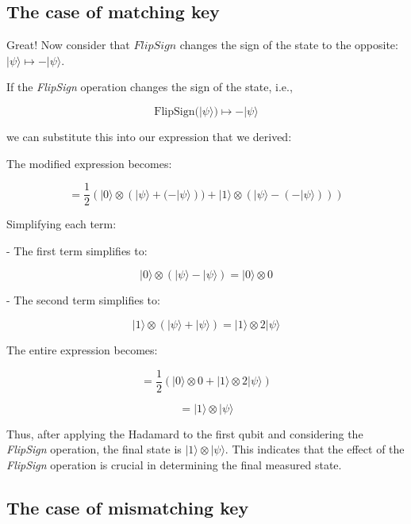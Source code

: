 \subsection{The case of matching key}

\begin{ai}
Great! Now consider that $FlipSign$ changes the sign of the state to the opposite: $|\psi\rangle
\mapsto -|\psi\rangle$.
\end{ai}

\begin{airesult}
If the \textit{FlipSign} operation changes the sign of the state, i.e.,

\[
\text{FlipSign}(|\psi\rangle) \mapsto -|\psi\rangle
\]

we can substitute this into our expression that we derived:

\vsp

The modified expression becomes:

\[
= \dfrac{1}{2} \left( |0\rangle \otimes (|\psi\rangle + (-|\psi\rangle))
+ |1\rangle \otimes (|\psi\rangle - (-|\psi\rangle)) \right)
\]

Simplifying each term:

- The first term simplifies to:

\[
|0\rangle \otimes (|\psi\rangle - |\psi\rangle) = |0\rangle \otimes 0
\]

- The second term simplifies to:

\[
|1\rangle \otimes (|\psi\rangle + |\psi\rangle) = |1\rangle \otimes 2|\psi\rangle
\]

The entire expression becomes:

\[
= \dfrac{1}{2} \left( |0\rangle \otimes 0 + |1\rangle \otimes 2|\psi\rangle \right)
\]

\[
= |1\rangle \otimes |\psi\rangle
\]

\vsp

Thus, after applying the Hadamard to the first qubit and considering the \textit{FlipSign}
operation, the final state is \(|1\rangle \otimes |\psi\rangle\). This indicates that the effect of
the \textit{FlipSign} operation is crucial in determining the final measured state.
\end{airesult}



\subsection{The case of mismatching key}

